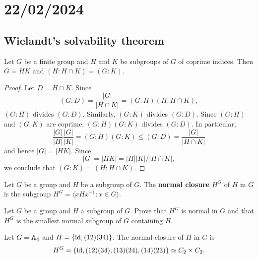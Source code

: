 \section{22/02/2024}

\subsection{Wielandt's solvability theorem}

\begin{lemma}
	\label{lemma:4Wielandt}
	Let $G$ be a finite group and $H$ and $K$ be subgroups of $G$ 
        of coprime indices. Then $G=HK$ and $(H:H\cap K)=(G:K)$.
\end{lemma}

\begin{proof}
	Let $D=H\cap K$. Since 
	\[
	(G:D)=\frac{|G|}{|H\cap K|}=(G:H)(H:H\cap K),
	\]
	$(G:H)$ divides $(G:D)$. Similarly, $(G:K)$ divides 
	$(G:D)$. Since $(G:H)$ and $(G:K)$ are coprime, $(G:H)(G:K)$
	divides $(G:D)$. In particular, 
	\[
	\frac{|G|}{|H|}\frac{|G|}{|K|}=(G:H)(G:K)\leq (G:D)=\frac{|G|}{|H\cap K|} 
	\]
	and hence $|G|=|HK|$. Since 
 \[
 |G|=|HK|=|H||K|/|H\cap K|,
 \]
 we conclude that 
	$(G:K)=(H:H\cap K)$.
\end{proof}

\begin{definition}
Let $G$ be a group and $H$ be a subgroup of $G$. The 
\textbf{normal closure} $H^G$ of $H$ in $G$ is the subgroup 
$H^G=\langle xHx^{-1}:x\in G\rangle$.
\end{definition}

\begin{exercise}
Let $G$ be a group and $H$ a subgroup of $G$. Prove that $H^G$ is normal in $G$ and that 
$H^G$ is the smallest normal subgroup of $G$ containing $H$. 
\end{exercise}


\begin{example}
Let $G=\mathbb{A}_4$ and $H=\{\operatorname{id},(12)(34)\}$. The normal closure of $H$ in $G$
is 
 \[
 H^G=\{\operatorname{id},(12)(34),(13)(24),(14)(23)\}\simeq C_2\times C_2.
 \]
\end{example}


